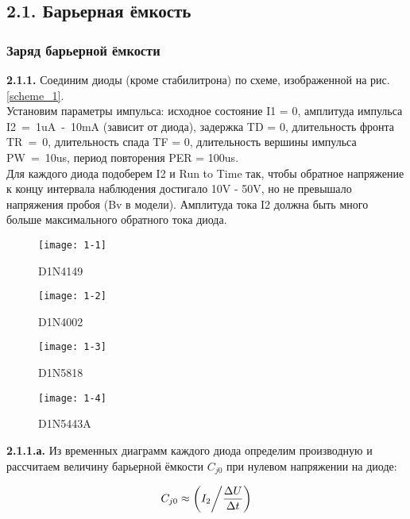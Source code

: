 \documentclass{semi}
\begin{document}
\subsection*{2.1. Барьерная ёмкость}

\subsubsection*{Заряд барьерной ёмкости}

\textbf{{\normalsize 2.1.1.}}
Соединим диоды (кроме стабилитрона) по схеме, изображенной на рис. \ref{scheme_1}.\\
Установим параметры импульса: исходное состояние I1 = 0, амплитуда импульса
I2~=~1uA~-~10mA (зависит от диода), задержка TD = 0, длительность фронта TR~=~0, длительность спада TF = 0, длительность вершины импульса PW~=~10us, период повторения PER = 100us.\\
Для каждого диода подоберем I2 и Run to Time так, чтобы обратное напряжение к концу интервала наблюдения достигало 10V - 50V, но не превышало напряжения пробоя (Bv в модели).
Амплитуда тока I2 должна быть много больше максимального обратного тока диода.

\vspace{2cm}

\begin{figure}[H]
	\centering
	\texttt{[image: 1-1]}
	\caption{D1N4149}
\end{figure}

\begin{figure}[H]
	\centering
	\texttt{[image: 1-2]}
	\caption{D1N4002}
\end{figure}

\begin{figure}[H]
	\centering
	\texttt{[image: 1-3]}
	\caption{D1N5818}
\end{figure}

\begin{figure}[H]
	\centering
	\texttt{[image: 1-4]}
	\caption{D1N5443A}
\end{figure}


\textbf{{\normalsize 2.1.1.а.}}
Из временных диаграмм каждого диода определим производную и рассчитаем величину барьерной ёмкости $ C_{j0} $ при нулевом напряжении на диоде:

\begin{equation}
	C_{j0}\approx \left(I_2 \middle/  \frac{\Delta U}{\Delta t}\right)
\end{equation}
\end{document}
